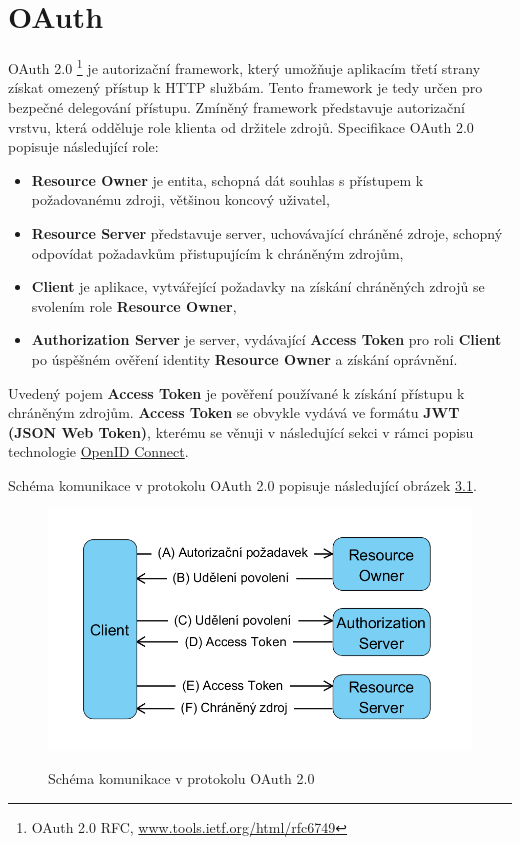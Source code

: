\documentclass[
  printed, %
  twoside, %
  table,   %
  nolof,     %
  nolot,     %
]{fithesis3}
\begin{document}
\section{OAuth}
\label{sec:oauth}
OAuth 2.0 \footnote{OAuth 2.0 RFC, \url{www.tools.ietf.org/html/rfc6749}} je autorizační framework, který umožňuje aplikacím třetí strany získat omezený přístup k HTTP službám. Tento framework je tedy určen pro bezpečné delegování přístupu. Zmíněný framework představuje autorizační vrstvu, která odděluje role klienta od držitele zdrojů. Specifikace OAuth 2.0 popisuje následující role: 
\begin{itemize}
    \item \textbf{Resource Owner} je entita, schopná dát souhlas s přístupem k požadovanému zdroji, většinou koncový uživatel,
    \item \textbf{Resource Server} představuje server, uchovávající chráněné zdroje, schopný odpovídat požadavkům přistupujícím k chráněným zdrojům,
    \item \textbf{Client} je aplikace, vytvářející požadavky na získání chráněných zdrojů se svolením role \textbf{Resource Owner},
    \item \textbf{Authorization Server} je server, vydávající \textbf{Access Token} pro roli \textbf{Client} po úspěšném ověření identity \textbf{Resource Owner} a získání oprávnění.
\end{itemize}
Uvedený pojem \textbf{Access Token} je pověření používané k získání přístupu k chráněným zdrojům. \textbf{Access Token} se obvykle vydává ve formátu \textbf{JWT (JSON Web Token)}, kterému se věnuji v následující sekci v rámci popisu technologie \hyperref[sec:oidc]{OpenID Connect}.  \par

Schéma komunikace v protokolu OAuth 2.0 popisuje následující obrázek \hyperref[fig:oauth]{3.1}. 

\begin{figure}[H]
\caption{Schéma komunikace v protokolu OAuth 2.0}
\centering
\includegraphics[width=12.8cm]{pics/diplomkaOauth} 
\label{fig:oauth}
\end{figure}
\par 
\end{document}
